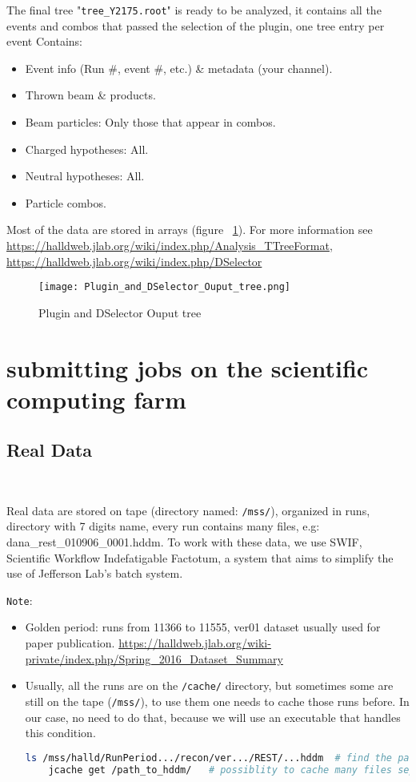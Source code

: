 \documentclass{article}
\begin{document}
The final tree "\texttt{tree\_Y2175.root}" is ready to be analyzed, it contains all the events and combos that passed the selection of the plugin, one tree entry per event Contains:

\begin{itemize}
\item Event info (Run \#, event \#, etc.) \& metadata (your channel).
\item Thrown beam \& products.
\item Beam particles: Only those that appear in combos.
\item Charged hypotheses: All.
\item Neutral hypotheses: All.
\item Particle combos.
\end{itemize}

Most of the data are stored in arrays (figure ~\ref{fig:2}).
\newline For more information see \url{https://halldweb.jlab.org/wiki/index.php/Analysis_TTreeFormat}, \url{https://halldweb.jlab.org/wiki/index.php/DSelector}
\begin{figure}[h!]
  \centering
  \texttt{[image: Plugin\_and\_DSelector\_Ouput\_tree.png]}
  \caption{Plugin and DSelector Ouput tree}
  \label{fig:2}
\end{figure}
\newpage
\section{submitting jobs on the scientific computing farm}

\subsection{Real Data}

~\par Real data are stored on tape (directory named: \texttt{/mss/}), organized in runs, directory with 7 digits name, every run contains many files, e.g: dana\_rest\_010906\_0001.hddm.
To work with these data, we use SWIF, Scientific Workflow Indefatigable Factotum, a system that aims to simplify the use of Jefferson Lab's batch system.

\texttt{Note}:
\begin{itemize}
\item Golden period: runs from 11366 to 11555, ver01 dataset usually used for paper publication. \url{https://halldweb.jlab.org/wiki-private/index.php/Spring_2016_Dataset_Summary}
\item Usually, all the runs are on the \texttt{/cache/} directory, but sometimes some are still on the tape (\texttt{/mss/}), to use them one needs to cache those runs before. In our case, no need to do that, because we will use an executable that handles this condition.
  \begin{lstlisting}[language=bash]
    ls /mss/halld/RunPeriod.../recon/ver.../REST/...hddm  # find the path
    jcache get /path_to_hddm/   # possiblity to cache many files separated by space
  \end{lstlisting}
\end{itemize}
\end{document}
